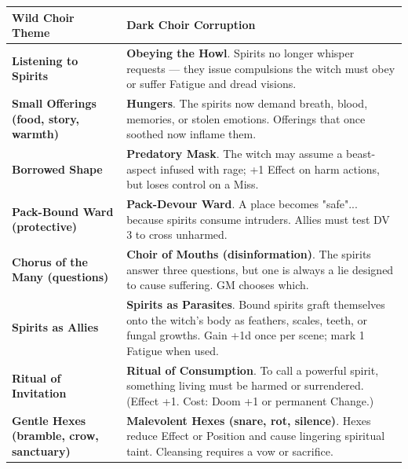 \documentclass[11pt]{book}
\begin{document}
    \begin{tcolorbox}[colback=black!3,colframe=black,title={Dark Choir: Thematic Swaps}]
    \begin{tabularx}{\textwidth}{>{\raggedright\arraybackslash}p{} X}
    \toprule
    \textbf{Wild Choir Theme} & \textbf{Dark Choir Corruption} \\ \midrule
    
    \textbf{Listening to Spirits}  
    & \textbf{Obeying the Howl}.  
    Spirits no longer whisper requests --- they issue compulsions the witch must obey or suffer Fatigue and dread visions. \\[0.8em]
    
    \textbf{Small Offerings (food, story, warmth)}  
    & \textbf{Hungers}.  
    The spirits now demand breath, blood, memories, or stolen emotions.  
    Offerings that once soothed now inflame them. \\[0.8em]
    
    \textbf{Borrowed Shape}  
    & \textbf{Predatory Mask}.  
    The witch may assume a beast-aspect infused with rage; +1 Effect on harm actions, but loses control on a Miss. \\[0.8em]
    
    \textbf{Pack-Bound Ward (protective)}  
    & \textbf{Pack-Devour Ward}.  
    A place becomes "safe"... because spirits consume intruders.  
    Allies must test DV 3 to cross unharmed. \\[0.8em]
    
    \textbf{Chorus of the Many (questions)}  
    & \textbf{Choir of Mouths (disinformation)}.  
    The spirits answer three questions, but one is always a lie designed to cause suffering.  
    GM chooses which. \\[0.8em]
    
    \textbf{Spirits as Allies}  
    & \textbf{Spirits as Parasites}.  
    Bound spirits graft themselves onto the witch's body as feathers, scales, teeth, or fungal growths.  
    Gain +1d once per scene; mark 1 Fatigue when used. \\[0.8em]
    
    \textbf{Ritual of Invitation}  
    & \textbf{Ritual of Consumption}.  
    To call a powerful spirit, something living must be harmed or surrendered.  
    (Effect +1. Cost: Doom +1 or permanent Change.) \\[0.8em]
    
    \textbf{Gentle Hexes (bramble, crow, sanctuary)}  
    & \textbf{Malevolent Hexes (snare, rot, silence)}.  
    Hexes reduce Effect or Position and cause lingering spiritual taint.  
    Cleansing requires a vow or sacrifice. \\[0.8em]
    

\end{tabularx}
\end{tcolorbox}
\end{document}
